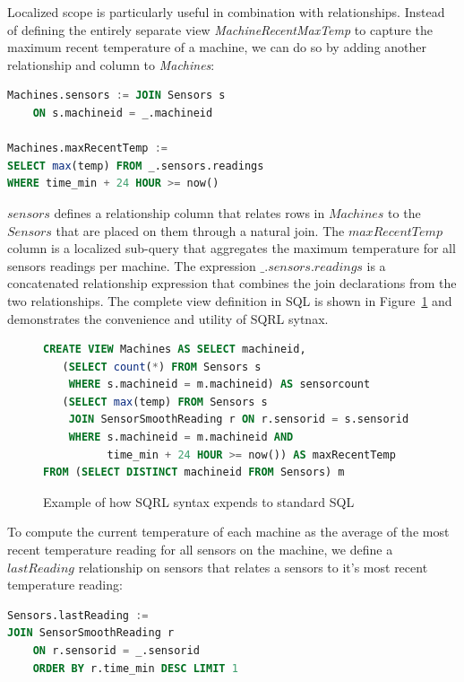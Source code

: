 \documentclass[	DIV=calc,%
							paper=letter,%
							fontsize=11pt,%
							twocolumn]{scrartcl}	 					%
\begin{document}
Localized scope is particularly useful in combination with relationships. Instead of defining the entirely separate view \emph{MachineRecentMaxTemp} to capture the maximum recent temperature of a machine, we can do so by adding another relationship and column to \emph{Machines}:

\begin{lstlisting}[language=SQL]
Machines.sensors := JOIN Sensors s
    ON s.machineid = _.machineid

Machines.maxRecentTemp :=
SELECT max(temp) FROM _.sensors.readings
WHERE time_min + 24 HOUR >= now()
\end{lstlisting}

$sensors$ defines a relationship column that relates rows in $Machines$ to the $Sensors$ that are placed on them through a natural join. The $maxRecentTemp$ column is a localized sub-query that aggregates the maximum temperature for all sensors readings per machine. The expression $\_.sensors.readings$ is a concatenated relationship expression that combines the join declarations from the two relationships.
The complete view definition in SQL is shown in Figure~\ref{fig:machinesView} and demonstrates the convenience and utility of SQRL sytnax.

\begin{figure}
\begin{lstlisting}[language=SQL]
CREATE VIEW Machines AS SELECT machineid,
   (SELECT count(*) FROM Sensors s
    WHERE s.machineid = m.machineid) AS sensorcount
   (SELECT max(temp) FROM Sensors s
    JOIN SensorSmoothReading r ON r.sensorid = s.sensorid
    WHERE s.machineid = m.machineid AND
          time_min + 24 HOUR >= now()) AS maxRecentTemp
FROM (SELECT DISTINCT machineid FROM Sensors) m
\end{lstlisting}
\caption{Example of how SQRL syntax expends to standard SQL}
\label{fig:machinesView}
\end{figure}

To compute the current temperature of each machine as the average of the most recent temperature reading for all sensors on the machine, we define a $lastReading$ relationship on sensors that relates a sensors to it's most recent temperature reading:

\begin{lstlisting}[language=SQL]
Sensors.lastReading :=
JOIN SensorSmoothReading r
    ON r.sensorid = _.sensorid
    ORDER BY r.time_min DESC LIMIT 1
\end{lstlisting}
\end{document}
